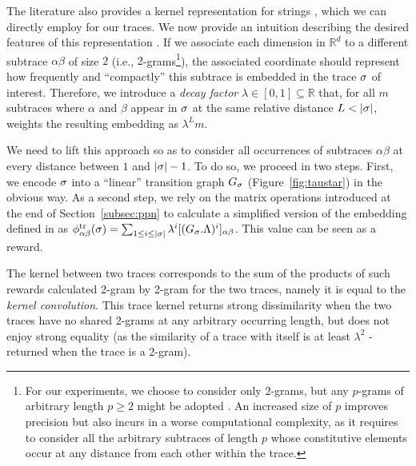 The literature also provides a kernel representation for strings \cite{LodhiSSCW02,GartnerFW03}, which we can directly employ for our traces. We now provide an intuition describing the desired features of this representation \cite{LodhiSSCW02}. If we associate each dimension in $\mathbb{R}^d$ to a different subtrace $\alpha\beta$ of size $2$ (i.e., $2$-grams\footnote{\label{fn:caveat}For our experiments, we choose to consider only $2$-grams, but any $p$-grams of arbitrary length $p\geq 2$ might be adopted \cite{Gartner03}. An increased size of $p$ improves precision but also incurs in a worse computational complexity, as it requires to consider all the arbitrary subtraces of length $p$ whose constitutive elements occur at any distance from each other within the trace.}), the associated coordinate should represent how frequently and ``compactly'' this subtrace is embedded in the trace $\sigma$ of interest. Therefore, we introduce a \emph{decay factor} $\lambda\in[0,1]\subseteq\mathbb{R}$ that, for all $m$ subtraces where $\alpha$ and $\beta$ appear in $\sigma$ at the same relative distance $L < |\sigma|$, weights the resulting embedding as $\lambda^Lm$.

We need to lift this approach so as to consider all occurrences of subtraces $\alpha\beta$ at every distance between $1$ and $|\sigma|-1$. To do so, we proceed in two steps. First, we encode $\sigma$ into a ``linear'' transition graph $G_\sigma$ (Figure~\ref{fig:taustar}) in the obvious way. %
As a second step, we rely on the matrix operations introduced at the end of Section~\ref{subsec:ppn} to calculate a simplified version of the embedding defined in \cite{LodhiSSCW02} as $\phi^{\text{tr}}_{\alpha\beta}(\sigma)=\sum_{1\leq i\leq |\sigma|}\lambda^i[(G_{\sigma}.\Lambda)^i]_{\alpha\beta}$. %
This value can be seen as a reward.

The kernel between two traces corresponds to the sum of the products of such rewards calculated 2-gram by 2-gram for the two traces, namely it is equal to the \emph{kernel convolution}. %
This trace kernel returns strong dissimilarity when the two traces have no shared 2-grams at any arbitrary occurring length, but does not enjoy strong equality (as the similarity of a trace with itself is at least $\lambda^2$ - returned when the trace is a 2-gram).

